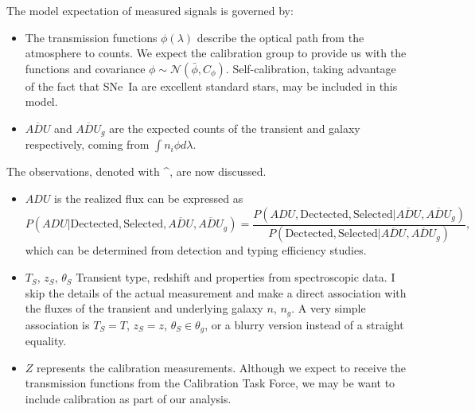 \documentclass[preprint]{aastex}
\begin{document}
The model expectation of measured  signals is governed by:
\begin{itemize}
\item The transmission functions $\phi(\lambda)$ describe the optical path from the
atmosphere to counts.  We expect
the calibration group to provide us with the functions and covariance
$\phi \sim \mathcal{N}(\bar{\phi},C_\phi)$. Self-calibration, taking advantage of the
fact that SNe~Ia are excellent standard stars, 
may be included in this model.
\item $\overline{\mathit{ADU}}$ and
$\overline{\mathit{ADU}}_g$ are the expected counts of the transient and galaxy respectively,
coming from $\int n_i \phi d\lambda$.
\end{itemize}

The observations, denoted with \textasciicircum, are now discussed.
\begin{itemize}
\item ${\mathit{ADU}}$ is the realized flux can be expressed as
\begin{equation}
P({\mathit{ADU}} | \text{Dectected}, \text{Selected}, \overline{\mathit{ADU}}, 
\overline{\mathit{ADU}}_g)=\frac{P({\mathit{ADU}},\text{Dectected}, \text{Selected} |  
\overline{\mathit{ADU}},  \overline{\mathit{ADU}}_g)}{P(\text{Dectected}, \text{Selected} | 
\overline{\mathit{ADU}},  \overline{{\mathit{ADU}}}_g)},
\end{equation}
which can be determined from detection and typing efficiency studies.
\item ${T}_S$, ${z}_S$, ${\theta}_S$ Transient type, redshift and properties from
spectroscopic data. I skip the details of the actual measurement  and make a direct association
with the fluxes of the transient and underlying galaxy $n$, $n_g$.
A very simple association is ${T}_S = T$, ${z}_S=z$, ${\theta}_S \in \theta_g$,
or a blurry version instead of a straight equality.
\item ${Z}$ represents the calibration measurements.  Although we expect to receive
the transmission functions from the Calibration Task Force, we may be want to include
calibration as part of our analysis.
\end{itemize}
\end{document}
